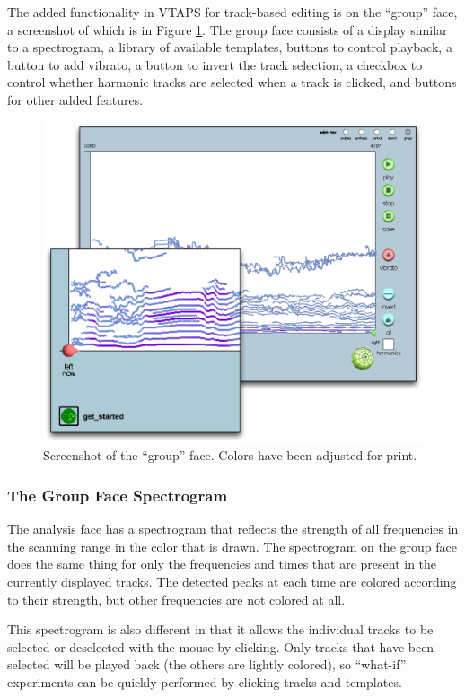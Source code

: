 \documentclass{article}
\begin{document}
The added functionality in VTAPS for track-based editing is on the ``group''
face, a screenshot of which is in Figure \ref{fig:group-face}. The group face
consists of a display similar to a spectrogram, a library of available
templates, buttons to control playback, a button to add vibrato, a button to
invert the track selection, a checkbox to control whether harmonic tracks are
selected when a track is clicked, and buttons for other added features.

\begin{figure}
\includegraphics[scale=0.104]{images/group-focused}

\caption{\label{fig:group-face}Screenshot of the ``group'' face. Colors have been adjusted for print.}
\end{figure}

\subsubsection{The Group Face Spectrogram}

The analysis face has a spectrogram that reflects the strength of all
frequencies in the scanning range in the color that is drawn. The spectrogram
on the group face does the same thing for only the frequencies and times that
are present in the currently displayed tracks. The detected peaks at each time
are colored according to their strength, but other frequencies are not colored
at all.

This spectrogram is also different in that it allows the individual tracks to
be selected or deselected with the mouse by clicking. Only tracks that have
been selected will be played back (the others are lightly colored), so
``what-if'' experiments can be quickly performed by clicking tracks and
templates.
\end{document}
